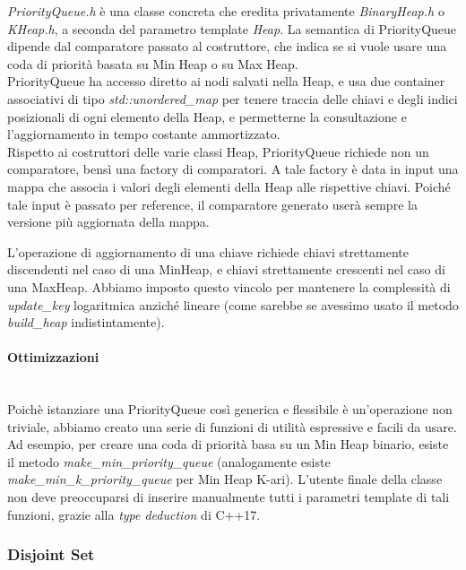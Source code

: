 \textit{PriorityQueue.h} è una classe concreta che eredita privatamente \textit{BinaryHeap.h} o \textit{KHeap.h}, a seconda del parametro template \textit{Heap}.
La semantica di PriorityQueue dipende dal comparatore passato al costruttore, che indica se si vuole usare una coda di priorità basata su Min Heap o su Max Heap. \\

\noindent PriorityQueue ha accesso diretto ai nodi salvati nella Heap, e usa due container associativi di tipo \textit{std::unordered\_map} per tenere traccia
delle chiavi e degli indici posizionali di ogni elemento della Heap, e permetterne la consultazione e l'aggiornamento in tempo costante ammortizzato. \\

\noindent Rispetto ai costruttori delle varie classi Heap, PriorityQueue richiede non un comparatore, bensì una factory di comparatori. A tale factory è data in input una mappa che associa i valori degli elementi della Heap alle rispettive chiavi. Poiché tale input è passato per reference, il comparatore generato userà sempre la versione più aggiornata della mappa.

\noindent L'operazione di aggiornamento di una chiave richiede chiavi strettamente discendenti nel caso di una MinHeap, e chiavi strettamente crescenti nel caso di una MaxHeap. Abbiamo imposto questo vincolo per mantenere la complessità di \textit{update\_key} logaritmica anziché lineare (come sarebbe se avessimo usato il metodo \textit{build\_heap} indistintamente).

\paragraph{Ottimizzazioni}\mbox{} \\

\noindent Poichè istanziare una PriorityQueue così generica e flessibile è un'operazione non triviale, abbiamo creato una serie di funzioni di utilità espressive e facili da usare. Ad esempio, per creare una coda di priorità basa su un Min Heap binario, esiste il metodo \textit{make\_min\_priority\_queue} (analogamente esiste \textit{make\_min\_k\_priority\_queue} per Min Heap K-ari).
L'utente finale della classe non deve preoccuparsi di inserire manualmente tutti i parametri template di tali funzioni, grazie alla \textit{type deduction} di C++17.

\subsubsection{Disjoint Set}

